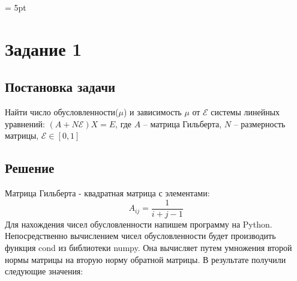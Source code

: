 \documentclass[a4paper, 14pt]{extarticle}
\begin{document}
	\pagebreak	
	\parskip = 5pt

	\section{Задание 1}
		\subsection{Постановка задачи}
			Найти число обусловленности($\mu$) и зависимость $\mu$ от $\mathcal{E}$ системы линейных уравнений: $(A + N \mathcal{E})X = E$, где $A$ -- матрица Гильберта, $N$ -- размерность матрицы, $\mathcal{E} \in [0, 1]$
	
		\subsection{Решение}
		Матрица Гильберта - квадратная матрица с элементами:
		\[ A_{ij} = \dfrac{1}{i + j - 1} \]
		Для нахождения чисел обусловленности напишем программу на Python. Непосредственно вычислением чисел обусловленности будет производить функция cond из библиотеки numpy. Она вычисляет путем умножения второй нормы матрицы на вторую норму обратной матрицы.
		В результате получили следующие значения:
\end{document}
